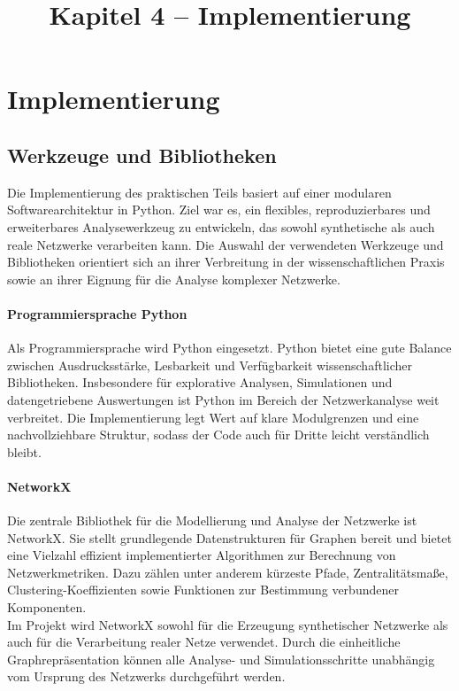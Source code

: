 \documentclass[12pt,a4paper]{article}
\title{Kapitel 4 -- Implementierung}
\author{}
\date{}
\begin{document}
\maketitle

\section{Implementierung}

\subsection{Werkzeuge und Bibliotheken}

Die Implementierung des praktischen Teils basiert auf einer modularen
Softwarearchitektur in Python. Ziel war es, ein flexibles, reproduzierbares
und erweiterbares Analysewerkzeug zu entwickeln, das sowohl synthetische als
auch reale Netzwerke verarbeiten kann. Die Auswahl der verwendeten Werkzeuge
und Bibliotheken orientiert sich an ihrer Verbreitung in der wissenschaftlichen
Praxis sowie an ihrer Eignung für die Analyse komplexer Netzwerke.

\paragraph{Programmiersprache Python}
Als Programmiersprache wird Python eingesetzt. Python bietet eine gute Balance
zwischen Ausdrucksstärke, Lesbarkeit und Verfügbarkeit wissenschaftlicher
Bibliotheken. Insbesondere für explorative Analysen, Simulationen und
datengetriebene Auswertungen ist Python im Bereich der Netzwerkanalyse weit
verbreitet. Die Implementierung legt Wert auf klare Modulgrenzen und eine
nachvollziehbare Struktur, sodass der Code auch für Dritte leicht verständlich
bleibt.

\paragraph{NetworkX}
Die zentrale Bibliothek für die Modellierung und Analyse der Netzwerke ist
NetworkX. Sie stellt grundlegende Datenstrukturen für Graphen bereit und bietet
eine Vielzahl effizient implementierter Algorithmen zur Berechnung von
Netzwerkmetriken. Dazu zählen unter anderem kürzeste Pfade, Zentralitätsmaße,
Clustering-Koeffizienten sowie Funktionen zur Bestimmung verbundener
Komponenten.\\
Im Projekt wird NetworkX sowohl für die Erzeugung synthetischer Netzwerke als
auch für die Verarbeitung realer Netze verwendet. Durch die einheitliche
Graphrepräsentation können alle Analyse- und Simulationsschritte unabhängig vom
Ursprung des Netzwerks durchgeführt werden.
\end{document}
